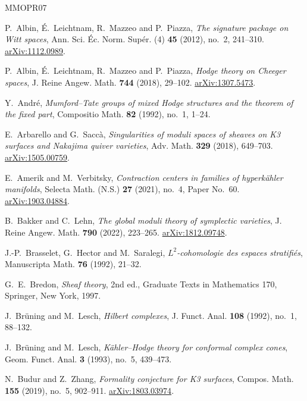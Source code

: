 \begin{thebibliography}{MMOPR07}

P.~Albin, \'E.~Leichtnam, R.~Mazzeo and P.~Piazza,
\emph{The signature package on Witt spaces},
Ann. Sci. \'Ec. Norm. Sup\'er. (4) \textbf{45} (2012), no.~2, 241--310.
\href{https://arxiv.org/abs/1112.0989}{arXiv:1112.0989}.

P.~Albin, \'E.~Leichtnam, R.~Mazzeo and P.~Piazza,
\emph{Hodge theory on Cheeger spaces},
J. Reine Angew. Math. \textbf{744} (2018), 29--102.
\href{https://arxiv.org/abs/1307.5473}{arXiv:1307.5473}.

Y.~Andr\'e, \emph{Mumford--Tate groups of mixed Hodge structures and
the theorem of the fixed part}, Compositio Math. \textbf{82} (1992),
no.~1, 1--24.

E.~Arbarello and G.~Sacc\`a,
\emph{Singularities of moduli spaces of sheaves on K3 surfaces and
Nakajima quiver varieties}, Adv. Math. \textbf{329} (2018), 649--703.
\href{https://arxiv.org/abs/1505.00759}{arXiv:1505.00759}.

E.~Amerik and M.~Verbitsky,
\emph{Contraction centers in families of hyperk\"ahler manifolds},
Selecta Math. (N.S.) \textbf{27} (2021), no.~4, Paper No.~60.
\href{https://arxiv.org/abs/1903.04884}{arXiv:1903.04884}.

B.~Bakker and C.~Lehn,
\emph{The global moduli theory of symplectic varieties},
J. Reine Angew. Math. \textbf{790} (2022), 223--265.
\href{https://arxiv.org/abs/1812.09748}{arXiv:1812.09748}.

J.-P.~Brasselet, G.~Hector and M.~Saralegi,
\emph{$L^2$-cohomologie des espaces stratifi\'es},
Manuscripta Math. \textbf{76} (1992), 21--32.

G.~E.~Bredon, \emph{Sheaf theory}, 2nd ed., Graduate Texts in
Mathematics 170, Springer, New York, 1997.

J.~Br\"uning and M.~Lesch, \emph{Hilbert complexes},
J. Funct. Anal. \textbf{108} (1992), no.~1, 88--132.

J.~Br\"uning and M.~Lesch,
\emph{K\"ahler--Hodge theory for conformal complex cones},
Geom. Funct. Anal. \textbf{3} (1993), no.~5, 439--473.

N.~Budur and Z.~Zhang, \emph{Formality conjecture for K3 surfaces},
Compos. Math. \textbf{155} (2019), no.~5, 902--911.
\href{https://arxiv.org/abs/1803.03974}{arXiv:1803.03974}.


\end{thebibliography}
